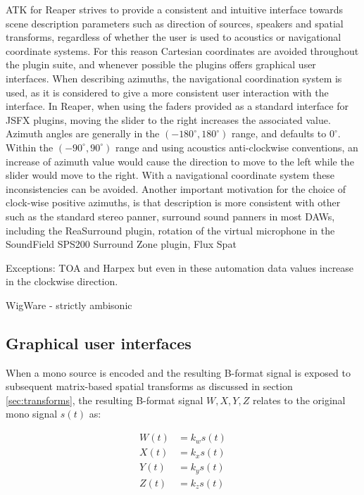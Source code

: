 \documentclass{article}
\begin{document}
ATK for Reaper strives to provide a consistent and intuitive interface towards scene description parameters such as direction of sources, speakers and spatial transforms, regardless of whether the user is used to acoustics or navigational coordinate systems.
For this reason Cartesian coordinates are avoided throughout the plugin suite, and whenever possible the plugins offers graphical user interfaces.
When describing azimuths, the navigational coordination system is used, as it is considered to give a more consistent user interaction with the interface.
In Reaper, when using the faders provided as a standard interface for JSFX plugins, moving the slider to the right increases the associated value.
Azimuth angles are generally in the $(-180^{\circ}, 180^{\circ})$ range, and defaults to $0^{\circ}$. 
Within the $(-90^{\circ}, 90^{\circ})$ range and using acoustics anti-clockwise conventions, an increase of azimuth value would cause the direction to move to the left while the slider would move to the right.
With a navigational coordinate system these inconsistencies can be avoided.
Another important motivation for the choice of clock-wise positive azimuths, is that description is more consistent with other 
such as the standard stereo panner, surround sound panners in most DAWs, including the ReaSurround plugin, 
rotation of the virtual microphone in the SoundField SPS200 Surround Zone plugin, 
Flux Spat

Exceptions: TOA and Harpex
but even in these automation data values increase in the clockwise direction.


WigWare - strictly ambisonic

\subsection{Graphical user interfaces}\label{sec:gui}

When a mono source is encoded and the resulting B-format signal is exposed to subsequent matrix-based spatial transforms as discussed in section \ref{sec:transforms}, the resulting B-format signal $W, X, Y, Z$ relates to the original mono signal $s(t)$ as:

\begin{equation} \label{eq:encoded}
\begin{split}
W(t) & = k_w s(t) \\
X(t) & = k_x s(t) \\
Y(t) & = k_y s(t) \\
Z(t) & = k_z s(t) \\
\end{split}
\end{equation}
\end{document}
